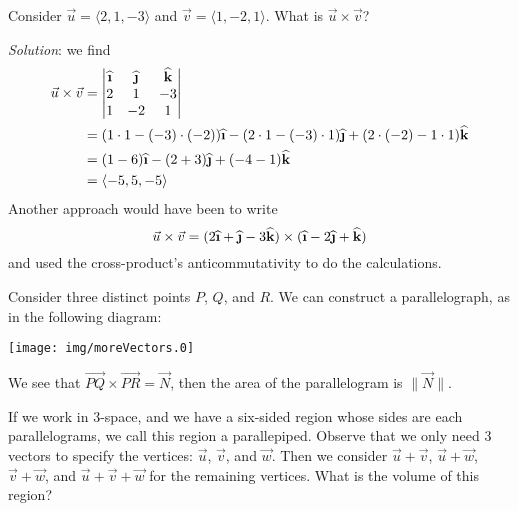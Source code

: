 \begin{example}
Consider $\vec{u}=\langle2,1,-3\rangle$ and
$\vec{v}=\langle1,-2,1\rangle$. What is $\vec{u}\times\vec{v}$?

\emph{Solution}: we find
\begin{equation}
\begin{aligned}
\vec{u}\times\vec{v} &= \begin{vmatrix}
\widehat{\textbf{\i}} & \widehat{\textbf{\j}} &\widehat{\textbf{k}}\\
2 & 1 & -3\\
1 & -2 & 1
\end{vmatrix}\\
&= (1\cdot1-(-3)\cdot(-2))\widehat{\textbf{\i}} 
- (2\cdot1-(-3)\cdot1)\widehat{\textbf{\j}} 
+(2\cdot(-2)-1\cdot1)\widehat{\textbf{k}}\\
&=(1-6)\widehat{\textbf{\i}} 
- (2+3)\widehat{\textbf{\j}} 
+(-4-1)\widehat{\textbf{k}}\\
&=\langle-5,5,-5\rangle
\end{aligned}
\end{equation}
Another approach would have been to write
\begin{equation}
\vec{u}\times\vec{v} 
= (2\widehat{\textbf{\i}} + \widehat{\textbf{\j}} -3\widehat{\textbf{k}})
\times(\widehat{\textbf{\i}} -2 \widehat{\textbf{\j}} +\widehat{\textbf{k}})
\end{equation}
and used the cross-product's anticommutativity to do the calculations.
\end{example}

Consider three distinct points $P$, $Q$, and $R$. We can
construct a parallelograph, as in the following diagram:
\begin{center}
\texttt{[image: img/moreVectors.0]}
\end{center}
We see that
$\overrightarrow{PQ}\times\overrightarrow{PR}=\vec{N}$, then the
area of the parallelogram is $\|\vec{N}\|$.

If we work in 3-space, and we have a six-sided region whose sides
are each parallelograms, we call this region a
parallepiped. Observe that we only need 3 vectors to specify the
vertices: $\vec{u}$, $\vec{v}$, and $\vec{w}$. Then we consider
$\vec{u}+\vec{v}$, $\vec{u}+\vec{w}$, $\vec{v}+\vec{w}$, and
$\vec{u}+\vec{v}+\vec{w}$ for the remaining vertices. What is the
volume of this region?

